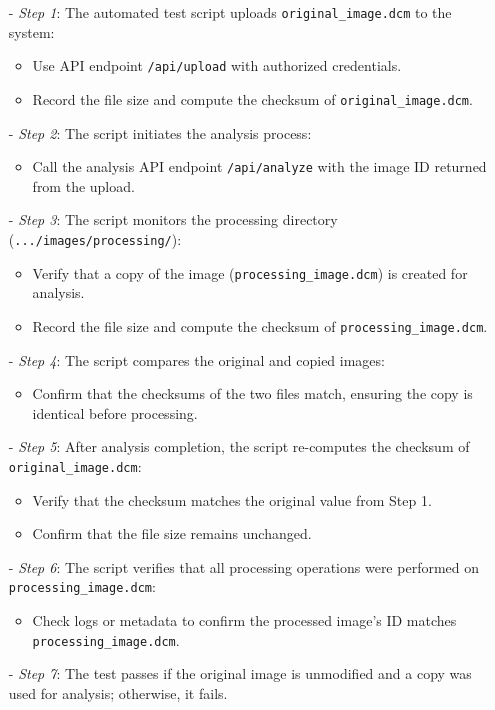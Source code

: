 \documentclass[12pt, titlepage]{article}
\begin{document}
\begin{enumerate}
\begin{itemize}
  \item[-] \textit{Step 1}: The automated test script uploads \texttt{original\_image.dcm} to the system:
    \begin{itemize}
      \item Use API endpoint \texttt{/api/upload} with authorized credentials.
      \item Record the file size and compute the checksum of \texttt{original\_image.dcm}.
    \end{itemize}
  \item[-] \textit{Step 2}: The script initiates the analysis process:
    \begin{itemize}
      \item Call the analysis API endpoint \texttt{/api/analyze} with the image ID returned from the upload.
    \end{itemize}
  \item[-] \textit{Step 3}: The script monitors the processing directory (\texttt{.../images/processing/}):
    \begin{itemize}
      \item Verify that a copy of the image (\texttt{processing\_image.dcm}) is created for analysis.
      \item Record the file size and compute the checksum of \texttt{processing\_image.dcm}.
    \end{itemize}
  \item[-] \textit{Step 4}: The script compares the original and copied images:
    \begin{itemize}
      \item Confirm that the checksums of the two files match, ensuring the copy is identical before processing.
    \end{itemize}
  \item[-] \textit{Step 5}: After analysis completion, the script re-computes the checksum of \texttt{original\_image.dcm}:
    \begin{itemize}
      \item Verify that the checksum matches the original value from Step 1.
      \item Confirm that the file size remains unchanged.
    \end{itemize}
  \item[-] \textit{Step 6}: The script verifies that all processing operations were performed on \texttt{processing\_image.dcm}:
    \begin{itemize}
      \item Check logs or metadata to confirm the processed image's ID matches \texttt{processing\_image.dcm}.
    \end{itemize}
  \item[-] \textit{Step 7}: The test passes if the original image is unmodified and a copy was used for analysis; otherwise, it fails.
\end{itemize}

\end{enumerate}
\end{document}
